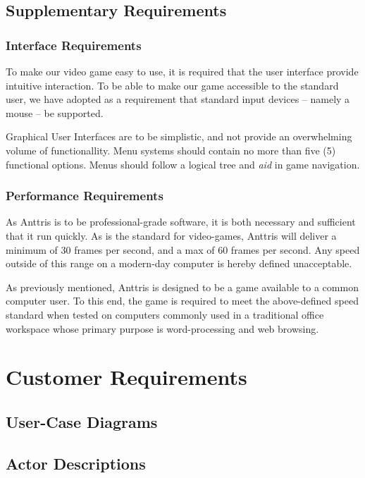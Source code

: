 \documentclass[12pt]{article}
\begin{document}
\subsection{Supplementary Requirements}\label{supplementary-reqs-SM}
\subsubsection{Interface Requirements}
To make our video game easy to use, it is required that the user interface
provide intuitive interaction. To be able to make our game accessible to
the standard user, we have adopted as a requirement that standard
input devices -- namely a mouse -- be supported.

Graphical User Interfaces are to be simplistic, and not provide an overwhelming
volume of functionallity. Menu systems should contain no more than five (5)
functional options. Menus should follow a logical tree and \textsl{aid} in
game navigation.
\subsubsection{Performance Requirements}
As Anttris is to be professional-grade software, it is both necessary and
sufficient that it run quickly. As is the standard for video-games, Anttris
will deliver a minimum of 30 frames per second, and a max of 60 frames per
second. Any speed outside of this range on a modern-day computer is hereby
defined unacceptable.

As previously mentioned, Anttris is designed to be a game available to a common
computer user. To this end, the game is required to meet the above-defined
speed standard when tested on computers commonly used in a traditional office
workspace whose primary purpose is word-processing and web browsing.

\section{Customer Requirements}\label{cust-reqs-HR}
\subsection{User-Case Diagrams}
\subsection{Actor Descriptions}
\end{document}
